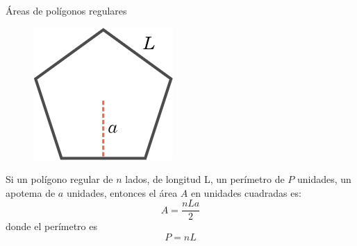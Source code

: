 \begin{infocard}{Áreas de polígonos regulares}
    \begin{figure}[H]
        \centering
        \includegraphics[width=0.6\linewidth]{../images/apotema.png}
    \end{figure}
        Si un polígono regular de $n$ lados, de longitud L, un perímetro de $P$ unidades, un apotema de $a$ unidades, entonces el área $A$ en unidades cuadradas es:
        \[A=\dfrac{nLa}{2}\]
        donde el perímetro es \[P=nL\]
\end{infocard}
